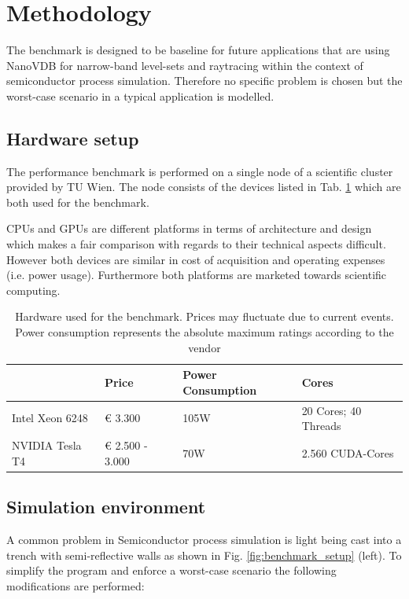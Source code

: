 \setcounter{section}{1}
\section{Methodology}

The benchmark is designed to be baseline for future applications that are using NanoVDB for narrow-band level-sets and raytracing within the context of semiconductor process simulation.
Therefore no specific problem is chosen but the worst-case scenario in a typical application is modelled.

\subsection{Hardware setup}
The performance benchmark is performed on a single node of a scientific cluster provided by TU Wien.
The node consists of the devices listed in Tab. \ref{tab:hardware} which are both used for the benchmark.

CPUs and GPUs are different platforms in terms of architecture and design which makes a fair comparison with regards to their technical aspects difficult.
However both devices are similar in cost of acquisition and operating expenses (i.e. power usage).
Furthermore both platforms are marketed towards scientific computing.


\begin{table}[H]

	\caption{Hardware used for the benchmark. Prices may fluctuate due to current events. Power consumption represents the absolute maximum ratings according to the vendor}
	\centering
	\begin{tabular}{@{}llll@{}}
		\toprule
		                & Price           & Power Consumption & Cores                \\ \hline
		Intel Xeon 6248 & € 3.300         & 105W              & 20 Cores; 40 Threads \\
		NVIDIA Tesla T4 & € 2.500 - 3.000 & 70W               & 2.560 CUDA-Cores     \\ \bottomrule
	\end{tabular}
	\label{tab:hardware}
\end{table}


\subsection{Simulation environment}

A common problem in Semiconductor process simulation is light being cast into a trench with semi-reflective walls as shown in Fig. \ref{fig:benchmark_setup} (left).
To simplify the program and enforce a worst-case scenario the following modifications are performed:

